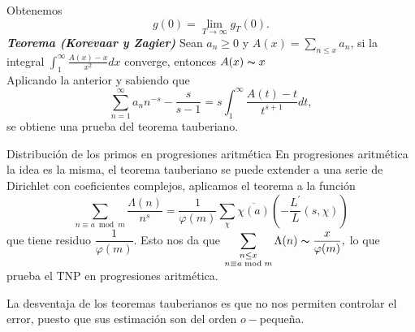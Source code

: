 \documentclass[final]{beamer}
\newlength{\colwidth}
\newcommand{\defi}[1]{\textbf{\textsl{#1}}}
\begin{document}
\begin{frame}[t,fragile]
\begin{columns}[t]
\begin{column}{\colwidth}
\begin{center}
\end{center}
Obtenemos \[
g(0) = \lim _{T \rightarrow \infty} g_T(0).
\]
\defi{Teorema (Korevaar y Zagier) }Sean $a_n\geq 0$ y $A(x)=\displaystyle\sum_{n\leq x} a_n$, si  la integral $\displaystyle\int_1^{\infty}\frac{A(x)-x}{x^2}dx$
converge, entonces $A(x)\thicksim x$\\
\vspace*{0.2cm}
Aplicando la anterior y sabiendo que 
\[
\sum_{n=1}^{\infty}a_nn^{-s} - \frac{s}{s-1} = s \int_1^{\infty} \frac{A(t)-t}{t^{s+1}} d t,
\]
se obtiene una prueba del teorema tauberiano.

\vspace*{0.2cm}
\begin{alertblock}{Distribución de los primos en progresiones aritmética}
En progresiones aritmética la idea es la misma, el teorema tauberiano se puede extender a una serie de  Dirichlet con coeficientes complejos, aplicamos el teorema a la función
$$\sum_{n\equiv a \bmod{m}}\dfrac{\Lambda(n)}{n^s}=\dfrac{1}{\varphi(m)}\sum_{\chi}\overline{\chi(a)}\left(-\dfrac{L^{\prime}}{L}(s,\chi)\right)$$
que tiene residuo $\dfrac{1}{\varphi(m)}$. Esto nos da que $\displaystyle\sum_{\substack{n\leq x\\n\equiv a\bmod{m}}}\Lambda(n)\thicksim \dfrac{x}{\varphi(m)},$
lo que prueba el TNP en progresiones aritmética.
\end{alertblock}

La desventaja de los teoremas tauberianos es que no nos permiten controlar el error, puesto que sus estimación son del orden $o-$pequeña.


\end{column}
\end{columns}
\end{frame}
\end{document}
